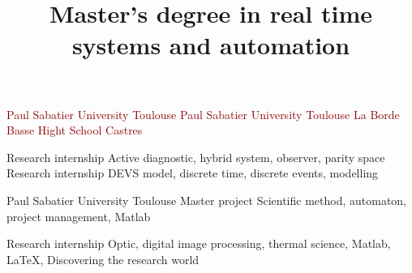 \documentclass[11pt,a4paper,sans]{moderncv}        %
\title{\huge Master's degree in real time systems and automation} %
\begin{document}
\begin{samepage}
\makecvtitle
\vspace{-1.3cm}%
\noindent\begin{minipage}[t]{.44\textwidth}%
\vspace*{-3mm}%
{\textcolor{darkred}{Paul Sabatier University}}%
{\textcolor{darkred}{Toulouse}}%
%
{\textcolor{darkred}{Paul Sabatier University}}%
{\textcolor{darkred}{Toulouse}}%
%
{\textcolor{darkred}{La Borde Basse Hight School}}%
{\textcolor{darkred}{Castres}}%
\end{minipage}\hfill%
\noindent\begin{minipage}[t]{.51\textwidth}
%
{Research internship}%
{Active diagnostic, hybrid system, observer, parity space}%
%
{Research internship}%
{DEVS model, discrete time, discrete events, modelling}%

%
{Paul Sabatier University}%
{Toulouse}%
{Master project}%
{Scientific method, automaton, project management, Matlab}%

%
{Research internship}%
{Optic, digital image processing, thermal science, Matlab, \LaTeX , Discovering the research world}%


\end{minipage}
\end{samepage}
\end{document}
